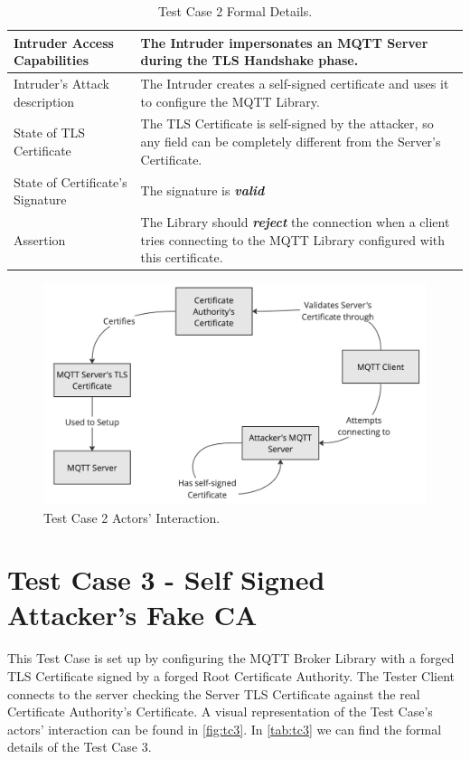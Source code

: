 \documentclass[binding=0.6cm,noexaminfo]{sapthesis}
\begin{document}
\begin{table}
\begin{center}
\begin{tabular}{| p{6cm} | p{6cm} |}
\hline
Intruder Access Capabilities & The Intruder impersonates an MQTT Server during the TLS Handshake phase. \\
\hline
Intruder’s Attack description & The Intruder creates a self-signed certificate and uses it to configure the MQTT Library. \\
\hline
State of TLS Certificate & The TLS Certificate is self-signed by the attacker, so any field can be completely different from the Server’s Certificate. \\
\hline
State of Certificate’s Signature & The signature is \textbf{\textit{valid}} \\
\hline
Assertion & The Library should \textbf{\textit{reject}} the connection when a client tries connecting to the MQTT Library configured with this certificate. \\
\hline
\end{tabular}
\caption{Test Case 2 Formal Details.}
\label{tab:tc2}
\end{center}
\end{table}

\begin{figure}[htb]
	\includegraphics[width=14cm]{TC2}
	\caption{Test Case 2 Actors' Interaction.}
	\label{fig:tc2}
\end{figure}

\section{Test Case 3 - Self Signed Attacker's Fake CA}
This Test Case is set up by configuring the MQTT Broker Library with a forged TLS Certificate signed by a forged Root Certificate Authority. The Tester Client connects to the server checking the Server TLS Certificate against the real Certificate Authority’s Certificate. A visual representation of the Test Case's actors' interaction can be found in \autoref{fig:tc3}.  In \autoref{tab:tc3} we can find the formal details of the Test Case 3.
\end{document}
